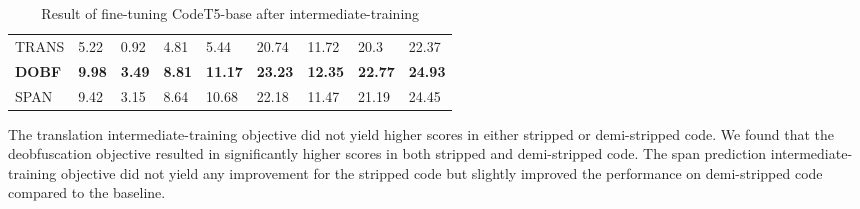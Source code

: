 \begin{table}[!h]
\begin{tabular}{l|llll|llll}
TRANS                                                  & 5.22                                & 0.92     & 4.81  &  5.44                                                       & 20.74                              & 11.72                               & 20.3  &  22.37                               \\
\textbf{DOBF}                                          & \textbf{9.98}                       & \textbf{3.49}                    & \textbf{8.81}                       & \textbf{11.17}                       & \textbf{23.23}                     & \textbf{12.35}                   & \textbf{22.77}                       & \textbf{24.93}                        \\
SPAN                                                   & 9.42                                & 3.15                             & 8.64  &  10.68                                & 22.18                              & 11.47                            & 21.19                                &   24.45                              
\end{tabular}
\caption{Result of fine-tuning CodeT5-base after intermediate-training}
\label{tab:intermediate}
\end{table}
The translation intermediate-training objective did not yield higher scores in either stripped or demi-stripped code. We found that the deobfuscation objective resulted in significantly higher scores in both stripped and demi-stripped code. The span prediction intermediate-training objective did not yield any improvement for the stripped code but slightly improved the performance on demi-stripped code compared to the baseline.

